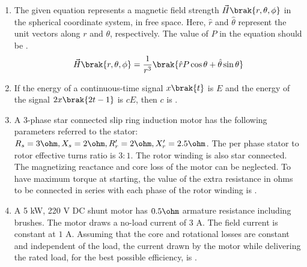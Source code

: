 \documentclass[journal,12pt,onecolumn]{IEEEtran}
\theoremstyle{remark}
\begin{document}
\begin{enumerate}[start=1, label=Q.\arabic*]
    \hfill{}

    \item The given equation represents a magnetic field strength $\vec{H}\brak{r, \theta, \phi}$ in the spherical coordinate system, in free space. Here, $\hat{r}$ and $\hat{\theta}$ represent the unit vectors along $r$ and $\theta$, respectively. The value of $P$ in the equation should be \underline{\hspace{2cm}} .
    \begin{align*}
        \vec{H}\brak{r, \theta, \phi} = \frac{1}{r^3}\brak{\hat{r}P\cos\theta + \hat{\theta}\sin\theta}
    \end{align*}

    \hfill{}

    \item If the energy of a continuous-time signal $x\brak{t}$ is $E$ and the energy of the signal $2x\brak{2t-1}$ is $cE$, then $c$ is \underline{\hspace{2cm}} .

    \hfill{}

    \item A 3-phase star connected slip ring induction motor has the following parameters referred to the stator: $R_s = 3 \ohm, X_s = 2 \ohm, R_r' = 2 \ohm, X_r' = 2.5 \ohm$. The per phase stator to rotor effective turns ratio is $3:1$. The rotor winding is also star connected. The magnetizing reactance and core loss of the motor can be neglected. To have maximum torque at starting, the value of the extra resistance in ohms  to be connected in series with each phase of the rotor winding is \underline{\hspace{2cm}} .

    \hfill{}

    \item A 5 kW, 220 V DC shunt motor has $0.5 \ohm$ armature resistance including brushes. The motor draws a no-load current of $3$ A. The field current is constant at $1$ A. Assuming that the core and rotational losses are constant and independent of the load, the current  drawn by the motor while delivering the rated load, for the best possible efficiency, is \underline{\hspace{2cm}} .


\end{enumerate}
\end{document}
